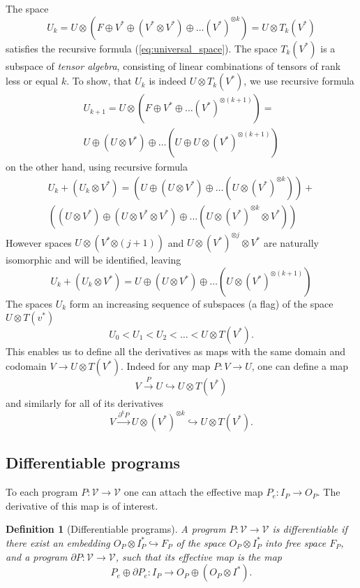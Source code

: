 \documentclass{article}
\newcommand{\VV}{\mathcal{V}}
\newcommand{\D}{\partial}
\newtheorem{definicija}{Definition}[section]
\begin{document}
The space 
\begin{equation}
\label{eq:k-th-virtual-space}
U_k = U\otimes \left(F\oplus V^* \oplus (V^*\otimes V^*)\oplus\ldots
(V^*)^{\otimes k}\right) = U\otimes T_k(V^*)
\end{equation}
satisfies the recursive formula (\ref{eq:universal_space}). The space $T_k(V^*)$
is a subspace of \emph{tensor algebra}, consisting of linear combinations of tensors of rank less
or equal $k$. To show, that $U_k$ is indeed $U\otimes T_k(V^*)$, we use
recursive formula
\begin{multline*}
  U_{k+1}=U\otimes(F\oplus V^*\oplus\ldots (V^*)^{\otimes (k+1)})=\\
 U\oplus (U\otimes V^*)\oplus\ldots (U\oplus U\otimes(V^*)^{\otimes (k+1)})
\end{multline*}
on the other hand, using recursive formula
\begin{multline}
  U_k+(U_k\otimes V^*) = \left( U\oplus (U\otimes V^*)\oplus\ldots (U\otimes(V^*)^{\otimes k})\right) + \\
  \left((U\otimes V^*) \oplus (U\otimes V^*\otimes V^*) \oplus\ldots (U\otimes(V^*)^{\otimes k}\otimes V^*)\right)
\end{multline}
However spaces $U\otimes(V^*{\otimes (j+1)})$ and $U\otimes (V^*)^{\otimes
  j}\otimes V^*$ are naturally isomorphic and will be identified, leaving 
\begin{equation}
  U_k+(U_k\otimes V^*) = U\oplus (U\otimes V^*)\oplus\ldots (U\otimes(V^*)^{\otimes (k+1)})
\end{equation}
The spaces $U_k$ form an increasing sequence of subspaces (a flag) of the space $U\otimes
T(v^*)$
\begin{equation}
  \label{eq:flag}
  U_0<U_1<U_2<\ldots < U\otimes T(V^*).
\end{equation}
This enables us to define all the derivatives as maps with
the same domain and codomain $V\to U\otimes T(V^*)$. Indeed for any map $P:V\to
U$, one can define a map 
$$V\xrightarrow{P}U\hookrightarrow U\otimes T(V^*)$$ and similarly  for all of its
derivatives
$$V\xrightarrow{\D^k P} U\otimes (V^*)^{\otimes k}\hookrightarrow U\otimes
T(V^*).$$
\subsection{Differentiable programs}
To each program $P:\VV\to \VV$ one can attach the effective map $P_e:I_P\to
O_P$. The derivative of this map is of interest. 
\begin{definicija}[Differentiable programs]
  A program $P:\VV\to \VV$ is differentiable if there exist an embedding
  $O_P\otimes I_P^*\hookrightarrow F_P$ of the space $O_P\otimes I_P^*$ into
  free space $F_P$, and a program $\D P:\VV\to \VV$, such that its effective
  map is the map
  \begin{equation}
    \label{eq:program_derivative}
    P_e\oplus \D P_e:I_P\rightarrow O_P\oplus (O_P\otimes I^*).
  \end{equation}
\end{definicija}
\end{document}
